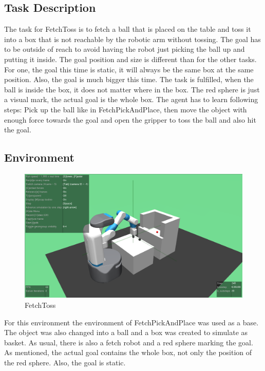 \subsection{Task Description}

The task for FetchToss is to fetch a ball that is placed on the table and toss it into a box that is not reachable by the robotic arm without tossing. The goal has to be outside of reach to avoid having the robot just picking the ball up and putting it inside. The goal position and size is different than for the other tasks. For one, the goal this time is static, it will always be the same box at the same position. Also, the goal is much bigger this time. The task is fulfilled, when the ball is inside the box, it does not matter where in the box. The red sphere is just a visual mark, the actual goal is the whole box. The agent has to learn following steps: Pick up the ball like in FetchPickAndPlace, then move the object with enough force towards the goal and open the gripper to toss the ball and also hit the goal.


\subsection{Environment}

\begin{figure} [h]
	
	\centering
	\includegraphics[width=1\textwidth]{figures/FetchToss-v2.png}
	\caption{FetchToss}
	
\end{figure}

For this environment the environment of FetchPickAndPlace was used as a base. The object was also changed into a ball and a box was created to simulate as basket. As usual, there is also a fetch robot and a red sphere marking the goal. As mentioned, the actual goal contains the whole box, not only the position of the red sphere. Also, the goal is static.

